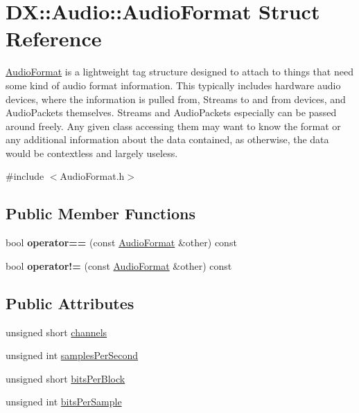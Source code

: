 \hypertarget{struct_d_x_1_1_audio_1_1_audio_format}{\section{D\-X\-:\-:Audio\-:\-:Audio\-Format Struct Reference}
\label{struct_d_x_1_1_audio_1_1_audio_format}
}


\hyperlink{struct_d_x_1_1_audio_1_1_audio_format}{Audio\-Format} is a lightweight tag structure designed to attach to things that need some kind of audio format information. This typically includes hardware audio devices, where the information is pulled from, Streams to and from devices, and Audio\-Packets themselves. Streams and Audio\-Packets especially can be passed around freely. Any given class accessing them may want to know the format or any additional information about the data contained, as otherwise, the data would be contextless and largely useless.  




{\ttfamily \#include $<$Audio\-Format.\-h$>$}

\subsection*{Public Member Functions}
\begin{DoxyCompactItemize}
\item 
\hypertarget{struct_d_x_1_1_audio_1_1_audio_format_aba69717f1269cb30d2f81aea5d17dfc5}{bool {\bfseries operator==} (const \hyperlink{struct_d_x_1_1_audio_1_1_audio_format}{Audio\-Format} \&other) const }\label{struct_d_x_1_1_audio_1_1_audio_format_aba69717f1269cb30d2f81aea5d17dfc5}

\item 
\hypertarget{struct_d_x_1_1_audio_1_1_audio_format_a93e1ebaa455c04c246413c3217f12e91}{bool {\bfseries operator!=} (const \hyperlink{struct_d_x_1_1_audio_1_1_audio_format}{Audio\-Format} \&other) const }\label{struct_d_x_1_1_audio_1_1_audio_format_a93e1ebaa455c04c246413c3217f12e91}

\end{DoxyCompactItemize}
\subsection*{Public Attributes}
\begin{DoxyCompactItemize}
\item 
unsigned short \hyperlink{struct_d_x_1_1_audio_1_1_audio_format_a99e6f97c11da52c68bb1cedc98dfe341}{channels}
\item 
unsigned int \hyperlink{struct_d_x_1_1_audio_1_1_audio_format_ae38016a3233f056484d95808eb53f781}{samples\-Per\-Second}
\item 
unsigned short \hyperlink{struct_d_x_1_1_audio_1_1_audio_format_aa6e6a2856d9afcd3b450f25316557c7b}{bits\-Per\-Block}
\item 
unsigned int \hyperlink{struct_d_x_1_1_audio_1_1_audio_format_a2e624e38652b39d310149e7a2259a4ee}{bits\-Per\-Sample}
\end{DoxyCompactItemize}


